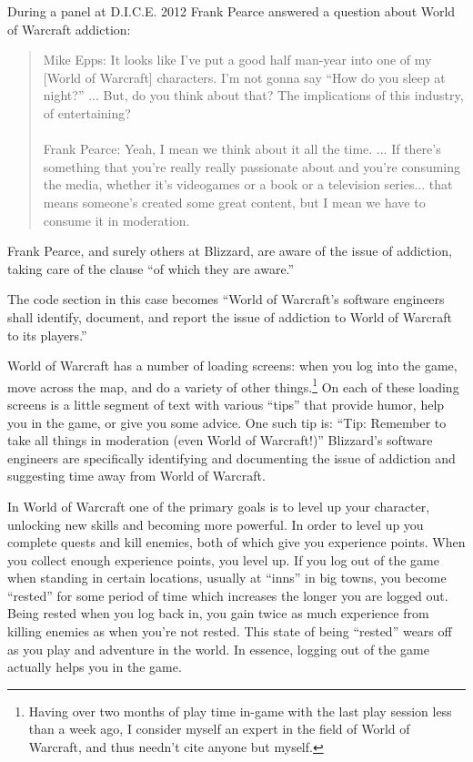 \documentclass[11pt]{article}
\begin{document}
\begin{multicols}{2}
During a panel at D.I.C.E. 2012 \cite{DICEInterview} Frank Pearce answered a question about World of Warcraft addiction:
\begin{quote}
Mike Epps: It looks like I've put a good half man-year into one of my [World of Warcraft] characters. I'm not gonna say ``How do you sleep at night?'' ... But, do you think about that? The implications of this industry, of entertaining?\\
\\
Frank Pearce: Yeah, I mean we think about it all the time. ... If there's something that you're really really passionate about and you're consuming the media, whether it's videogames or a book or a television series... that means someone's created some great content, but I mean we have to consume it in moderation.
\end{quote}
Frank Pearce, and surely others at Blizzard, are aware of the issue of addiction, taking care of the clause ``of which they are aware.''

The code section in this case becomes ``World of Warcraft's software engineers shall identify, document, and report the issue of addiction to World of Warcraft to its players.''

World of Warcraft has a number of loading screens: when you log into the game, move across the map, and do a variety of other things.\footnote{Having over two months of play time in-game with the last play session less than a week ago, I consider myself an expert in the field of World of Warcraft, and thus needn't cite anyone but myself.} On each of these loading screens is a little segment of text with various ``tips'' that provide humor, help you in the game, or give you some advice. One such tip is: ``Tip: Remember to take all things in moderation (even World of Warcraft!)'' \cite{LoadingScreenTips} Blizzard's software engineers are specifically identifying and documenting the issue of addiction and suggesting time away from World of Warcraft.

In World of Warcraft one of the primary goals is to level up your character, unlocking new skills and becoming more powerful. In order to level up you complete quests and kill enemies, both of which give you experience points. When you collect enough experience points, you level up. If you log out of the game when standing in certain locations, usually at ``inns'' in big towns, you become ``rested'' for some period of time which increases the longer you are logged out. Being rested when you log back in, you gain twice as much experience from killing enemies as when you're not rested. This state of being ``rested'' wears off as you play and adventure in the world. In essence, logging out of the game actually helps you in the game.


\end{multicols}
\end{document}
